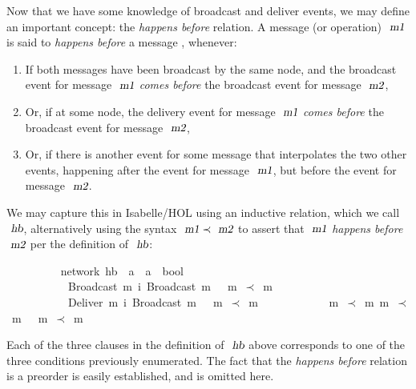\documentclass[acmlarge,review,anonymous]{acmart}\settopmatter{printfolios=true}
\begin{document}
Now that we have some knowledge of broadcast and deliver events, we may define an important concept: the \emph{happens before} relation.
A message (or operation) $\isa{m1}$ is said to \emph{happens before} a message , whenever:
\begin{enumerate}
\item
If both messages have been broadcast by the same node, and the broadcast event for message $\isa{m1}$ \emph{comes before} the broadcast event for message $\isa{m2}$,
\item
Or, if at some node, the delivery event for message $\isa{m1}$ \emph{comes before} the broadcast event for message $\isa{m2}$,
\item
Or, if there is another event for some message that interpolates the two other events, happening after the event for message $\isa{m1}$, but before the event for message $\isa{m2}$.
\end{enumerate}
We may capture this in Isabelle/HOL using an inductive relation, which we call $\isa{hb}$, alternatively using the syntax $\isa{m1} \prec \isa{m2}$ to assert that $\isa{m1}$ \emph{happens before} $\isa{m2}$ per the definition of $\isa{hb}$:
\\
\begin{isabellebody}
\ \ \ \ \ \ \ \  {\isacharparenleft}\ network{\isacharparenright}\ hb\ {\isacharcolon}{\isacharcolon}\ {\isachardoublequoteopen}{\isacharprime}a\ {\isasymRightarrow}\ {\isacharprime}a\ {\isasymRightarrow}\ bool{\isachardoublequoteclose}\ \isanewline
\ \ \ \ \ \ \ \ \ \ {\isachardoublequoteopen}{\isasymlbrakk}\ Broadcast\ m{}\ {\isasymsqsubset}\isactrlsup i\ Broadcast\ m{}\ {\isasymrbrakk}\ {\isasymLongrightarrow}\ m{}\ $\prec$\ m{}{\isachardoublequoteclose}\ {\isacharbar}\isanewline
\ \ \ \ \ \ \ \ \ \ {\isachardoublequoteopen}{\isasymlbrakk}\ Deliver\ m{}\ {\isasymsqsubset}\isactrlsup i\ Broadcast\ m{}\ {\isasymrbrakk}\ {\isasymLongrightarrow}\ m{}\ $\prec$\ m{}{\isachardoublequoteclose}\ {\isacharbar}\isanewline
\ \ \ \ \ \ \ \ \ \ {\isachardoublequoteopen}{\isasymlbrakk}\ m{}\ $\prec$\  m{}{\isacharsemicolon}\ m{}\ $\prec$\ m{}\ {\isasymrbrakk}\ {\isasymLongrightarrow}\ m{}\ $\prec$\ m{}{\isachardoublequoteclose}
\end{isabellebody}
\vspace{\baselineskip}
Each of the three clauses in the definition of $\isa{hb}$ above corresponds to one of the three conditions previously enumerated.
The fact that the \emph{happens before} relation is a preorder is easily established, and is omitted here.
\end{document}
